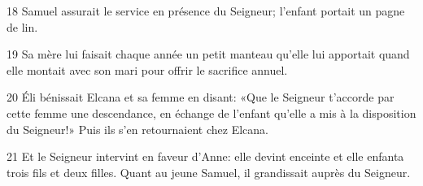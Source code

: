 
18 Samuel assurait le service en présence du Seigneur; l’enfant portait un pagne de lin.

19 Sa mère lui faisait chaque année un petit manteau qu’elle lui apportait quand elle montait avec son mari pour offrir le sacrifice annuel.

20 Éli bénissait Elcana et sa femme en disant: «Que le Seigneur t’accorde par cette femme une descendance, en échange de l’enfant qu’elle a mis à la disposition du Seigneur!» Puis ils s’en retournaient chez Elcana.

21 Et le Seigneur intervint en faveur d’Anne: elle devint enceinte et elle enfanta trois fils et deux filles. Quant au jeune Samuel, il grandissait auprès du Seigneur.